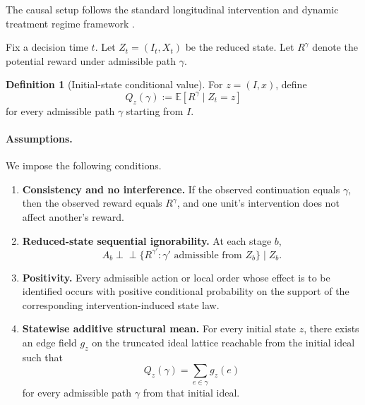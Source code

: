 \documentclass{article}
\theoremstyle{definition}
\newtheorem{definition}[theorem]{Definition}
\newcommand{\EE}{\mathbb E}
\begin{document}
The causal setup follows the standard longitudinal intervention and dynamic treatment regime framework \cite{robins1986,robins1987,murphy2003,murphy2005,hernanrobins2020,qian2011}.

Fix a decision time \(t\). Let $Z_t=(I_t,X_t)$
be the reduced state. Let \(R^\gamma\) denote the potential reward under admissible path \(\gamma\).

\begin{definition}[Initial-state conditional value]
For \(z=(I,x)\), define
\begin{equation}
Q_z(\gamma):=\EE[R^\gamma\mid Z_t=z]
\label{eq:initial-state-conditional-value}
\end{equation}
for every admissible path \(\gamma\) starting from \(I\).
\end{definition}

\paragraph{Assumptions.}
We impose the following conditions.

\begin{enumerate}
    \item[\textbf{C1.}] \textbf{Consistency and no interference.}
    If the observed continuation equals \(\gamma\), then the observed reward equals \(R^\gamma\), and one unit's intervention does not affect another's reward.

    \item[\textbf{C2.}] \textbf{Reduced-state sequential ignorability.}
    At each stage \(b\),
    \begin{equation}
    A_b \perp\!\!\!\perp \{R^{\gamma'}:\gamma' \text{ admissible from } Z_b\}\mid Z_b.
    \label{eq:reduced-state-ignorability}
    \end{equation}

    \item[\textbf{C3.}] \textbf{Positivity.}
    Every admissible action or local order whose effect is to be identified occurs with positive conditional probability on the support of the corresponding intervention-induced state law.

    \item[\textbf{C4.}] \textbf{Statewise additive structural mean.}
    For every initial state \(z\), there exists an edge field \(g_z\) on the truncated ideal lattice reachable from the initial ideal such that
    \begin{equation}
    \textstyle Q_z(\gamma)=\sum_{e\in\gamma} g_z(e)
    \label{eq:statewise-additive-mean}
    \end{equation}
    for every admissible path \(\gamma\) from that initial ideal.
\end{enumerate}
\end{document}
